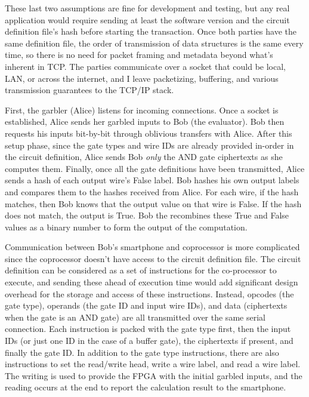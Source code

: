 These last two assumptions are fine for development and testing, but any real application would require sending at least the software version and the circuit definition file's hash before starting the transaction. Once both parties have the same definition file, the order of transmission of data structures is the same every time, so there is no need for packet framing and metadata beyond what's inherent in TCP. The parties communicate over a socket that could be local, LAN, or across the internet, and I leave packetizing, buffering, and various transmission guarantees to the TCP/IP stack.

First, the garbler (Alice) listens for incoming connections. Once a socket is established, Alice sends her garbled inputs to Bob (the evaluator). Bob then requests his inputs bit-by-bit through oblivious transfers with Alice. After this setup phase, since the gate types and wire IDs are already provided in-order in the circuit definition, Alice sends Bob \textit{only} the AND gate ciphertexts as she computes them. Finally, once all the gate definitions have been transmitted, Alice sends a hash of each output wire's False label. Bob hashes his own output labels and compares them to the hashes received from Alice. For each wire, if the hash matches, then Bob knows that the output value on that wire is False. If the hash does not match, the output is True. Bob the recombines these True and False values as a binary number to form the output of the computation.

Communication between Bob's smartphone and coprocessor is more complicated since the coprocessor doesn't have access to the circuit definition file. The circuit definition can be considered as a set of instructions for the co-processor to execute, and sending these ahead of execution time would add significant design overhead for the storage and access of these instructions. Instead, opcodes (the gate type), operands (the gate ID and input wire IDs), and data (ciphertexts when the gate is an AND gate) are all transmitted over the same serial connection. Each instruction is packed with the gate type first, then the input IDs (or just one ID in the case of a buffer gate), the ciphertexts if present, and finally the gate ID. In addition to the gate type instructions, there are also instructions to set the read/write head, write a wire label, and read a wire label. The writing is used to provide the FPGA with the initial garbled inputs, and the reading occurs at the end to report the calculation result to the smartphone.


